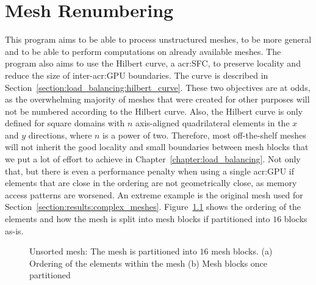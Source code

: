 \chapter{Mesh Renumbering}\label{chapter:renumbering}

This program aims to be able to process unstructured meshes, to be more general and to be able to
perform computations on already available meshes. The program also aims to use the Hilbert curve, a
\acrlong{acr:SFC}, to preserve locality and reduce the size of inter-\acrshort{acr:GPU} boundaries.
The curve is described in Section~\ref{section:load_balancing:hilbert_curve}. These two objectives
are at odds, as the overwhelming majority of meshes that were created for other purposes will not be
numbered according to the Hilbert curve. Also, the Hilbert curve is only defined for square domains
with \(n\) axis-aligned quadrilateral elements in the \(x\) and \(y\) directions, where \(n\) is a
power of two. Therefore, most off-the-shelf meshes will not inherit the good locality and small
boundaries between mesh blocks that we put a lot of effort to achieve in
Chapter~\ref{chapter:load_balancing}. Not only that, but there is even a performance penalty when
using a single \acrshort{acr:GPU} if elements that are close in the ordering are not geometrically
close, as memory access patterns are worsened. An extreme example is the original mesh used for
Section~\ref{section:results:complex_meshes}. Figure~\ref{fig:mesh_unsorted} shows the ordering of
the elements and how the mesh is split into mesh blocks if partitioned into \(16\) blocks as-is. 

\begin{figure}[H]
	\centering
	\caption{Unsorted mesh: The mesh is partitioned into \(16\) mesh blocks. (a) Ordering of the elements within the mesh (b) Mesh blocks once partitioned}\label{fig:mesh_unsorted}
\end{figure}

